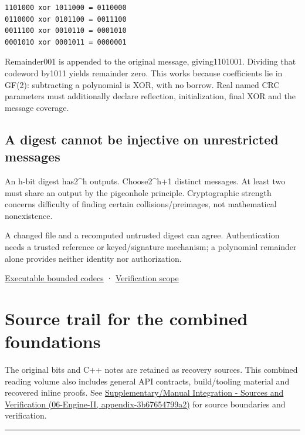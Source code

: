 \begin{verbatim}
1101000 xor 1011000 = 0110000
0110000 xor 0101100 = 0011100
0011100 xor 0010110 = 0001010
0001010 xor 0001011 = 0000001
\end{verbatim}

Remainder001 is appended to the original message, giving1101001. Dividing that codeword by1011 yields remainder zero. This works because coefficients lie in GF(2): subtracting a polynomial is XOR, with no borrow. Real named CRC parameters must additionally declare reflection, initialization, final XOR and the message coverage.

\subsection{A digest cannot be injective on unrestricted messages}\label{01-foundations-i-ch011-a-digest-cannot-be-injective-on-unrestricted-messages}

An h-bit digest has2\^{}h outputs. Choose2\^{}h+1 distinct messages. At least two must share an output by the pigeonhole principle. Cryptographic strength concerns difficulty of finding certain collisions/preimages, not mathematical nonexistence.

A changed file and a recomputed untrusted digest can agree. Authentication needs a trusted reference or keyed/signature mechanism; a polynomial remainder alone provides neither identity nor authorization.

\hyperref[appendix-4e2236f53445-representation-codecs-and-bounded-file-laboratory]{Executable bounded codecs} · \hyperref[appendix-a103e7846d21]{Verification scope}

\section{Source trail for the combined foundations}\label{01-foundations-i-ch011-source-trail-for-the-combined-foundations}

The original bits and C++ notes are retained as recovery sources. This combined reading volume also includes general API contracts, build/tooling material and recovered inline proofs. See \href{../06-Engine-II/main.pdf\#nameddest=appendix-3b67654799a2}{Supplementary/Manual Integration - Sources and Verification (06-Engine-II, appendix-3b67654799a2)} for source boundaries and verification.

\begin{center}\rule{0.5\linewidth}{0.5pt}\end{center}

